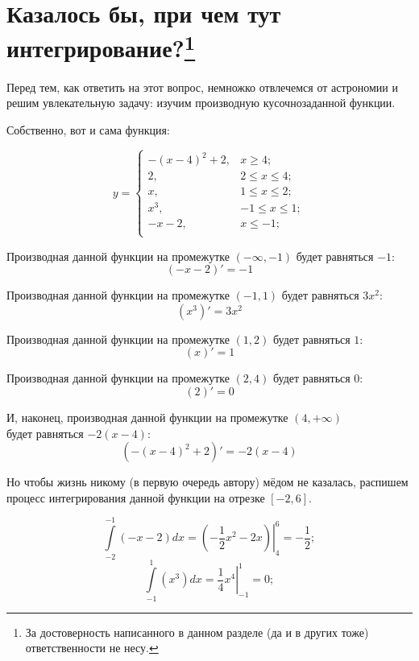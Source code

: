 \documentclass{article}
\begin{document}
	\section[Казалось бы, при чем тут интегрирование?]{Казалось бы, при чем тут интегрирование?\footnote{За достоверность написанного в данном разделе (да и в других тоже) ответственности не несу.}}
    Перед тем, как ответить на этот вопрос, немножко отвлечемся от астрономии и решим увлекательную задачу: изучим производную кусочнозаданной функции. \par 
    Собственно, вот и сама функция: \par 
    \begin{equation}
    	y = \begin{cases}
    		-(x-4)^2+2, & x \geqslant 4;\\
    		2, & 2 \leqslant x \leqslant 4;\\
    		x, & 1 \leqslant x \leqslant 2;\\
    		x^3, & -1 \leqslant x \leqslant 1;\\
    		-x-2, & x \leqslant -1;\\	
    	\end{cases}
    \end{equation} \par
    Производная данной функции на промежутке $(-\infty,-1) $ будет равняться $-1$: $$ (-x-2)' = -1$$ \par
    Производная данной функции на промежутке $(-1,1) $ будет равняться $3x^2$: $$ \left(x^3\right)' = 3x^2$$ \par
    Производная данной функции на промежутке $(1,2) $ будет равняться $1$: $$ (x)' = 1$$ \par
    Производная данной функции на промежутке $(2,4) $ будет равняться $0$: $$ (2)' = 0$$ \par
    И, наконец, производная данной функции на промежутке $(4,+\infty) $ \\будет равняться $-2(x-4)$: $$ \left(-\left(x-4\right)^2+2\right)' = -2(x-4)$$ \par
    Но чтобы жизнь никому (в первую очередь автору) мёдом не казалась, распишем процесс интегрирования данной функции на отрезке $[-2,6]$. \par 
    \begin{equation}
    	\int\limits_{-2}^{-1} (-x-2)dx =\left.\left(-\frac{1}{2}x^2-2x\right)\right|_{4}^{6} = -\frac{1}{2}; 
    \end{equation}
    \begin{equation}
    	\int\limits_{-1}^{1} \left(x^3\right)dx = \left.\frac{1}{4}x^4\right|_{-1}^{1} = 0;
    \end{equation}
\end{document}
